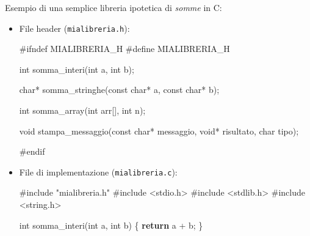 \documentclass[
  letterpaper,
]{scrbook}
\newenvironment{Shaded}{\begin{snugshade}}{\end{snugshade}}
\newcommand{\ControlFlowTok}[1]{\textcolor[rgb]{0.00,0.23,0.31}{\textbf{#1}}}
\newcommand{\DataTypeTok}[1]{\textcolor[rgb]{0.68,0.00,0.00}{#1}}
\newcommand{\ImportTok}[1]{\textcolor[rgb]{0.00,0.46,0.62}{#1}}
\newcommand{\NormalTok}[1]{\textcolor[rgb]{0.00,0.23,0.31}{#1}}
\newcommand{\OperatorTok}[1]{\textcolor[rgb]{0.37,0.37,0.37}{#1}}
\newcommand{\PreprocessorTok}[1]{\textcolor[rgb]{0.68,0.00,0.00}{#1}}
\begin{document}
Esempio di una semplice libreria ipotetica di \emph{somme} in C:

\begin{itemize}
\item
  File header (\texttt{mialibreria.h}):

\begin{Shaded}
\begin{Highlighting}[]
\PreprocessorTok{\#ifndef MIALIBRERIA\_H}
\PreprocessorTok{\#define MIALIBRERIA\_H}

\DataTypeTok{int}\NormalTok{ somma\_interi}\OperatorTok{(}\DataTypeTok{int}\NormalTok{ a}\OperatorTok{,} \DataTypeTok{int}\NormalTok{ b}\OperatorTok{);}

\DataTypeTok{char}\OperatorTok{*}\NormalTok{ somma\_stringhe}\OperatorTok{(}\DataTypeTok{const} \DataTypeTok{char}\OperatorTok{*}\NormalTok{ a}\OperatorTok{,} \DataTypeTok{const} \DataTypeTok{char}\OperatorTok{*}\NormalTok{ b}\OperatorTok{);}

\DataTypeTok{int}\NormalTok{ somma\_array}\OperatorTok{(}\DataTypeTok{int}\NormalTok{ arr}\OperatorTok{[],} \DataTypeTok{int}\NormalTok{ n}\OperatorTok{);}

\DataTypeTok{void}\NormalTok{ stampa\_messaggio}\OperatorTok{(}\DataTypeTok{const} \DataTypeTok{char}\OperatorTok{*}\NormalTok{ messaggio}\OperatorTok{,} 
                      \DataTypeTok{void}\OperatorTok{*}\NormalTok{ risultato}\OperatorTok{,} 
                      \DataTypeTok{char}\NormalTok{ tipo}\OperatorTok{);}

\PreprocessorTok{\#endif}
\end{Highlighting}
\end{Shaded}
\item
  File di implementazione (\texttt{mialibreria.c}):

\label{annotated-cell-78}%
\begin{Shaded}
\begin{Highlighting}[]
\PreprocessorTok{\#include }\ImportTok{"mialibreria.h"}
\PreprocessorTok{\#include }\ImportTok{\textless{}stdio.h\textgreater{}}
\PreprocessorTok{\#include }\ImportTok{\textless{}stdlib.h\textgreater{}}
\PreprocessorTok{\#include }\ImportTok{\textless{}string.h\textgreater{}}

\DataTypeTok{int}\NormalTok{ somma\_interi}\OperatorTok{(}\DataTypeTok{int}\NormalTok{ a}\OperatorTok{,} \DataTypeTok{int}\NormalTok{ b}\OperatorTok{)} \OperatorTok{\{}
  \ControlFlowTok{return}\NormalTok{ a }\OperatorTok{+}\NormalTok{ b}\OperatorTok{;}
\OperatorTok{\}}


\end{Highlighting}
\end{Shaded}
\end{itemize}
\end{document}

